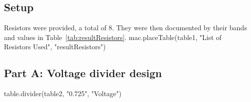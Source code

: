{%
{%

{%
{%
{%

\subsection{Setup}
\label{sub:Setup}
Resistors were provided, a total of 8. They were then documented by
their bands and values in Table~\ref{tab:resultResistors}.
{{ mac.placeTable(table1, "List of Resistors Used", "resultResistors")}}

\subsection{Part A: Voltage divider design}
\label{sub:resultsA}
{{ table.divider(table2, "0.725", "Voltage") }}
}}}}}
